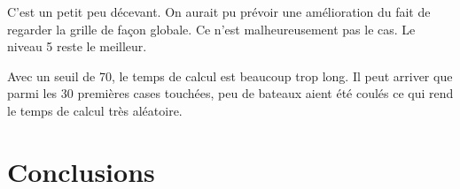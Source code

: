 \begin{center}
\end{center}

C'est un petit peu décevant. On aurait pu prévoir une amélioration du fait de regarder la grille de façon globale. Ce n'est malheureusement pas le cas. Le niveau 5 reste le meilleur.

Avec un seuil de 70, le temps de calcul est beaucoup trop long. Il peut arriver que parmi les 30 premières cases touchées, peu de bateaux aient été coulés ce qui rend le temps de calcul très aléatoire.

\newpage
\section{Conclusions}


